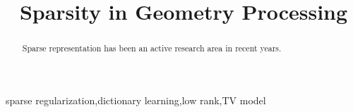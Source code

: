 \documentclass[3p,twocolumn]{elsarticle}
\begin{document}
\begin{frontmatter}

\title{Sparsity in Geometry Processing}
%
%
%
%

\begin{abstract}
Sparse representation has been an active research area in recent years.
\end{abstract}


\begin{keyword}
sparse regularization\sep dictionary learning\sep low rank\sep TV model
\end{keyword}

\end{frontmatter}

%




%


%

\end{document}
